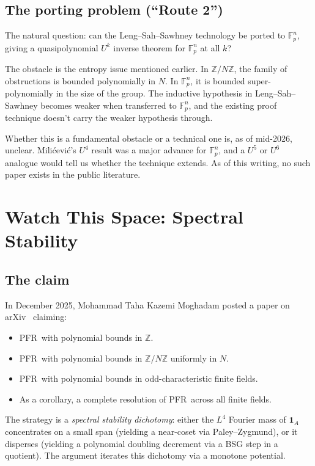 \documentclass[11pt,a4paper]{article}
\theoremstyle{plain}
\theoremstyle{definition}
\theoremstyle{remark}
\newcommand{\F}{\mathbb{F}}
\newcommand{\Z}{\mathbb{Z}}
\newcommand{\PFR}{\textsf{PFR}}
\begin{document}
\subsection{The porting problem (``Route 2'')}

The natural question: can the Leng--Sah--Sawhney technology be ported to $\F_p^n$, giving a quasipolynomial $U^k$ inverse theorem for $\F_p^n$ at all $k$?

The obstacle is the entropy issue mentioned earlier. In $\Z/N\Z$, the family of obstructions is bounded polynomially in $N$. In $\F_p^n$, it is bounded super-polynomially in the size of the group. The inductive hypothesis in Leng--Sah--Sawhney becomes weaker when transferred to $\F_p^n$, and the existing proof technique doesn't carry the weaker hypothesis through.

Whether this is a fundamental obstacle or a technical one is, as of mid-2026, unclear. Milićević's $U^4$ result was a major advance for $\F_p^n$, and a $U^5$ or $U^6$ analogue would tell us whether the technique extends. As of this writing, no such paper exists in the public literature.

\section{Watch This Space: Spectral Stability}\label{sec:spectral}

\subsection{The claim}

In December 2025, Mohammad Taha Kazemi Moghadam posted a paper on arXiv~\cite{kazemi2025} claiming:

\begin{itemize}[leftmargin=2em]
  \item \PFR\ with polynomial bounds in $\Z$.
  \item \PFR\ with polynomial bounds in $\Z/N\Z$ uniformly in $N$.
  \item \PFR\ with polynomial bounds in odd-characteristic finite fields.
  \item As a corollary, a complete resolution of \PFR\ across all finite fields.
\end{itemize}

The strategy is a \emph{spectral stability dichotomy}: either the $L^4$ Fourier mass of $\mathbf{1}_A$ concentrates on a small span (yielding a near-coset via Paley--Zygmund), or it disperses (yielding a polynomial doubling decrement via a BSG step in a quotient). The argument iterates this dichotomy via a monotone potential.
\end{document}
